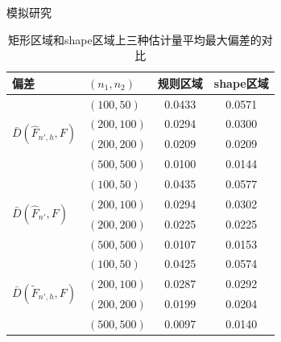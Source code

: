 \documentclass{beamer}
\begin{document}
\begin{frame}{模拟研究}
\small
\vspace{-0.3cm}
\begin{table}[!htb]
\caption{ 矩形区域和shape区域上三种估计量平均最大偏差的对比}
\begin{center}
\begin{tabular}{llcc}
        \toprule
        偏差 & $(n_1,n_2)$ & 规则区域 & shape区域 \\
        \midrule
        \multirow{4}{*}{$\bar{D}(\hat{F}_{n',h},F)$} 
            & $(100,50)$    & 0.0433 & 0.0571\\
            & $(200,100)$   & 0.0294 & 0.0300 \\
            & $(200,200)$   & 0.0209 & 0.0209 \\
            & $(500,500)$   & 0.0100 & 0.0144 \\
        \midrule
        \multirow{4}{*}{$\bar{D}(\hat{F}_{n'},F)$} 
            & $(100,50)$    & 0.0435 & 0.0577\\
            & $(200,100)$   & 0.0294 & 0.0302 \\
            & $(200,200)$   & 0.0225 & 0.0225 \\
            & $(500,500)$   & 0.0107 & 0.0153\\
        \midrule
        \multirow{4}{*}{$\bar{D}(\tilde{F}_{n',h},F)$} 
            & $(100,50)$    & 0.0425 & 0.0574 \\
            & $(200,100)$   & 0.0287 & 0.0292 \\
            & $(200,200)$   & 0.0199 & 0.0204 \\
            & $(500,500)$   & 0.0097 & 0.0140\\
        \bottomrule
    \end{tabular}
\end{center}
\end{table}
\end{frame}
\end{document}

